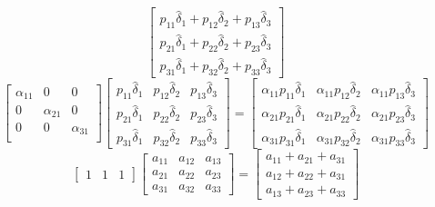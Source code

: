 \documentclass[journal,twoside,web]{ieeecolor}
\begin{document}
\begin{figure*}[ht]
\begin{equation*}
\begin{bmatrix}
    p_{11}\hat{\delta}_{1}  + p_{12}\hat{\delta}_{2}  + p_{13}\hat{\delta}_{3} \\
    p_{21}\hat{\delta}_{1}  + p_{22}\hat{\delta}_{2}  + p_{23}\hat{\delta}_{3} \\
    p_{31}\hat{\delta}_{1}  + p_{32}\hat{\delta}_{2}  + p_{33}\hat{\delta}_{3} 
\end{bmatrix}
\end{equation*}
\begin{equation*}
    \begin{bmatrix}
    \alpha_{11} & 0 & 0 \\
    0 & \alpha_{21} & 0 \\
    0 & 0 & \alpha_{31} \\
\end{bmatrix}
\begin{bmatrix}
    p_{11}\hat{\delta}_{1}  & p_{12}\hat{\delta}_{2}  & p_{13}\hat{\delta}_{3}  \\
    p_{21}\hat{\delta}_{1}  & p_{22}\hat{\delta}_{2}  & p_{23}\hat{\delta}_{3}  \\
    p_{31}\hat{\delta}_{1}  & p_{32}\hat{\delta}_{2}  & p_{33}\hat{\delta}_{3}  
\end{bmatrix}=
\begin{bmatrix}
    \alpha_{11}p_{11}\hat{\delta}_{1}  & \alpha_{11}p_{12}\hat{\delta}_{2}  & \alpha_{11}p_{13}\hat{\delta}_{3}  \\
    \alpha_{21}p_{21}\hat{\delta}_{1}  & \alpha_{21}p_{22}\hat{\delta}_{2}  & \alpha_{21}p_{23}\hat{\delta}_{3}  \\
    \alpha_{31}p_{31}\hat{\delta}_{1}  & \alpha_{31}p_{32}\hat{\delta}_{2}  & \alpha_{31}p_{33}\hat{\delta}_{3}  
\end{bmatrix}
\end{equation*}
\begin{equation*}
\begin{bmatrix}
    1 & 1 & 1
\end{bmatrix} 
\begin{bmatrix}
    a_{11}  & a_{12}  & a_{13}  \\
    a_{21}  & a_{22}  & a_{23}  \\
    a_{31}  & a_{32}  & a_{33}  
\end{bmatrix} = 
\begin{bmatrix}
    a_{11}  + a_{21}  + a_{31}  \\
    a_{12}  + a_{22}  + a_{31}  \\
    a_{13}  + a_{23}  + a_{33}  

\end{bmatrix}
\end{equation*}
\end{figure*}
\end{document}
